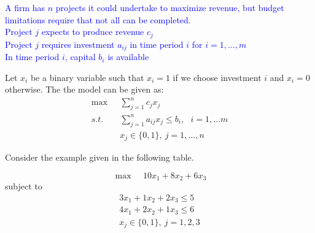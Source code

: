 

	\textcolor{blue}{A firm has $n$ projects it could undertake to maximize revenue, but budget limitations require that not all can be completed.}\\
	\textcolor{blue}{Project $j$ expects to produce revenue $c_j$\\
		Project $j$ requires investment $a_{ij}$ in time period $i$ for $i = 1,\ldots,m$\\
		In time period $i$, capital $b_i$ is available}
		
		Let $x_i$ be a binary variable such that $x_i = 1$ if we choose investment $i$ and $x_i = 0$ otherwise.  The the model can be given as:
	\begin{align*}
	\max ~~~& \sum_{j = 1}^n c_jx_j\\
	s.t. ~~~&\sum_{j = 1}^n a_{ij}x_j\leq b_i, ~~~i = 1,\ldots m\\
	& x_j \in \{0,1\} , \ j = 1,\ldots,n
	\end{align*}


Consider the example given in the following table.
	\begin{table}[h]
		\centering
	\end{table}
	$$
	\max~~~~~ 10x_1+8x_2+6x_3
	$$
	subject to
	\begin{align*}
	3x_1+1x_2+2x_3\leq5\\
	4x_1+2x_2+1x_3\leq6\\
	x_j \in \{0,1\},\  j = 1,2,3
	\end{align*}